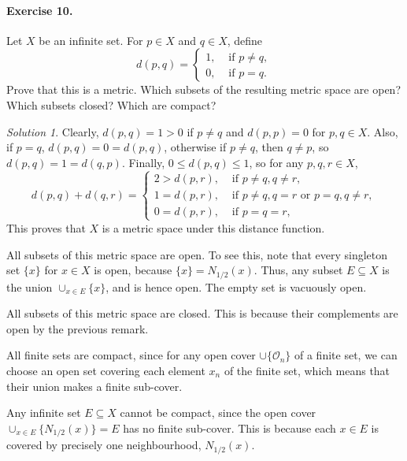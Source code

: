 \documentclass[11pt]{report}
\def\O{\mathscr{O}}
\theoremstyle{remark}
\newtheorem*{solution}{Solution}
\begin{document}
    \paragraph{Exercise 10.} Let $X$ be an infinite set. For $p \in X$ and $q \in
    X$, define \[
        d(p, q) = \begin{cases}
            1, &\text{ if }p \neq q, \\
            0, &\text{ if }p = q. 
        \end{cases}    
    \] Prove that this is a metric. Which subsets of the resulting metric space are
    open? Which subsets closed? Which are compact?
    \begin{solution}
        Clearly, $d(p, q) = 1 > 0$ if $p \neq q$ and $d(p, p) = 0$ for $p, q \in X$.
        Also, if $p = q$, $d(p, q) = 0 = d(p, q)$, otherwise if $p \neq q$, then $q
        \neq p$, so $d(p, q) = 1 = d(q, p)$. Finally, $0 \leq d(p, q) \leq 1$, so
        for any $p, q, r \in X$, \[
            d(p, q) + d(q, r) = \begin{cases}
                2 > d(p, r), &\text{ if }p \neq q, q \neq r, \\
                1 = d(p, r), &\text{ if }p \neq q, q = r \text{ or } p = q, q \neq r, \\
                0 = d(p, r), &\text{ if }p = q = r,
            \end{cases}
        \] This proves that $X$ is a metric space under this distance function.

        All subsets of this metric space are open. To see this, note that every
        singleton set $\{x\}$ for $x \in X$ is open, because $\{x\} = N_{1 / 2}(x)$.
        Thus, any subset $E \subseteq X$ is the union $\cup_{x \in E} \{x\}$, and is
        hence open. The empty set is vacuously open.

        All subsets of this metric space are closed. This is because their
        complements are open by the previous remark.

        All finite sets are compact, since for any open cover $\cup \{\O_n\}$ of a
        finite set, we can choose an open set covering each element $x_n$ of the
        finite set, which means that their union makes a finite sub-cover.
        
        Any infinite set $E \subseteq X$ cannot be compact, since the open cover
        $\cup_{x \in E} \{N_{1 / 2}(x)\} = E$ has no finite sub-cover. This is
        because each $x \in E$ is covered by precisely one neighbourhood, $N_{1 /
        2}(x)$.
    \end{solution}
\end{document}
